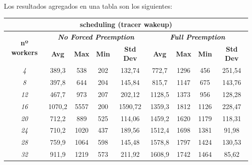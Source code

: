 \documentclass[../main.tex]{subfiles}
\begin{document}
Los resultados agregados en una tabla son los siguientes:

\begin{table}[htp]
\begin{tabular}{|c|c|c|c|c|c|c|c|c|}
\hline
\multicolumn{9}{|c|}{\textbf{scheduling (tracer wakeup)}}                                                                                                                            \\ \hline
\multirow{2}{*}{\textbf{nº workers}} & \multicolumn{4}{c|}{\textit{\textbf{No Forced Preemption}}}   & \multicolumn{4}{c|}{\textit{\textbf{Full Preemption}}}        \\ \cline{2-9} 
                                     & \textbf{Avg} & \textbf{Max} & \textbf{Min} & \textbf{Std Dev} & \textbf{Avg} & \textbf{Max} & \textbf{Min} & \textbf{Std Dev} \\ \hline
\textit{4}                           & 389,3        & 538          & 202          & 132,74           & 772,7        & 1296         & 456          & 251,54           \\ \hline
\textit{8}                           & 397,8        & 644          & 204          & 145,84           & 815,7        & 1147         & 675          & 143,76           \\ \hline
\textit{12}                          & 467,7        & 973          & 207          & 202,12           & 1128,5       & 1373         & 956          & 128,28           \\ \hline
\textit{16}                          & 1070,2       & 5557         & 200          & 1590,72          & 1359,3       & 1812         & 1126         & 228,47           \\ \hline
\textit{20}                          & 712,2        & 889          & 525          & 114,06           & 1459,2       & 1620         & 1179         & 118,31           \\ \hline
\textit{24}                          & 710,2        & 1020         & 437          & 189,56           & 1512,4       & 1698         & 1381         & 91,98            \\ \hline
\textit{28}                          & 759,9        & 1064         & 598          & 145,48           & 1578,8       & 1797         & 1424         & 130,53           \\ \hline
\textit{32}                          & 911,9        & 1219         & 573          & 211,92           & 1608,9       & 1742         & 1464         & 85,62            \\ \hline

\end{tabular}
\end{table}
\end{document}
